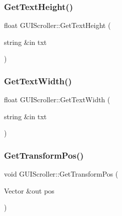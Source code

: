 \hypertarget{class_g_u_i_scroller_a74dda26509c77ae897afb325074b997e}{}\label{class_g_u_i_scroller_a74dda26509c77ae897afb325074b997e} 
\subsubsection{\texorpdfstring{Get\+Text\+Height()}{GetTextHeight()}}
{\footnotesize\ttfamily float G\+U\+I\+Scroller\+::\+Get\+Text\+Height (\begin{DoxyParamCaption}\item[{string \&in}]{txt }\end{DoxyParamCaption})}

\hypertarget{class_g_u_i_scroller_a950a3d1f118bcf2466e7a31d7bf487df}{}\label{class_g_u_i_scroller_a950a3d1f118bcf2466e7a31d7bf487df} 
\subsubsection{\texorpdfstring{Get\+Text\+Width()}{GetTextWidth()}}
{\footnotesize\ttfamily float G\+U\+I\+Scroller\+::\+Get\+Text\+Width (\begin{DoxyParamCaption}\item[{string \&in}]{txt }\end{DoxyParamCaption})}

\hypertarget{class_g_u_i_scroller_a4c09399d7d12ef27d0a2079b2cd7bce3}{}\label{class_g_u_i_scroller_a4c09399d7d12ef27d0a2079b2cd7bce3} 
\subsubsection{\texorpdfstring{Get\+Transform\+Pos()}{GetTransformPos()}}
{\footnotesize\ttfamily void G\+U\+I\+Scroller\+::\+Get\+Transform\+Pos (\begin{DoxyParamCaption}\item[{Vector \&out}]{pos }\end{DoxyParamCaption})}

\hypertarget{class_g_u_i_scroller_ab7154e6dd37f538cc44db9973f88f08d}{}\label{class_g_u_i_scroller_ab7154e6dd37f538cc44db9973f88f08d} 
